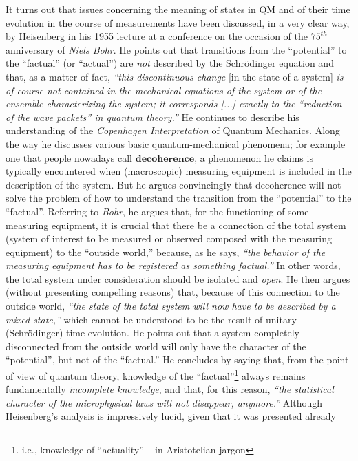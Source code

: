 \documentclass[12pt]{article}
\begin{document}
It turns out that issues concerning the meaning of states in QM and of their time evolution in the course of
measurements have been discussed, in a very clear way, by {Heisenberg} in his 1955 lecture 
\cite{Heisenberg} at a conference on the occasion of the $75^{th}$ anniversary of \textit{Niels Bohr}. He points out 
that transitions from the ``potential'' to the ``factual'' (or ``actual'') are \textit{not} described by the Schr\"odinger equation 
and that, as a matter of fact, \textit{``this discontinuous change} [in the state of a system] \textit{is of course not 
contained in the mechanical equations of the system or of the ensemble characterizing the system; it corresponds [...] 
exactly to the ``reduction of the wave packets'' in quantum theory.''} He continues to describe his 
understanding of the \textit{Copenhagen Interpretation} of Quantum Mechanics. Along the way he discusses various 
basic quantum-mechanical phenomena; for example one that people nowadays call $\mathbf{decoherence}$, a phenomenon 
he claims is typically encountered when (macroscopic) measuring equipment is included in the description of the system. 
But he argues convincingly that decoherence will not solve the problem of how to 
understand the transition from the ``potential'' to the ``factual''. 
Referring to \textit{Bohr}, he argues that, for the functioning 
of some measuring equipment, it is crucial that there be a connection of the total system (system of interest to be 
measured or observed composed with the measuring equipment) to the ``outside world,'' because, as he says, 
\textit{``the behavior of the measuring equipment has to be registered as something factual.''} In other words, the total
system under consideration should be isolated and \textit{open}.
He then argues (without presenting compelling reasons) that, because of this connection to the outside 
world, \textit{``the state of the total system will now have to be  described by a mixed state,''} which 
cannot be understood to be the result of unitary (Schr\"odinger) time evolution.
He points out that a system completely disconnected from the outside world will only 
 have the character of the ``potential'', but not of the ``factual.'' He concludes by saying that, 
from the point of view of quantum theory, knowledge of the ``factual''\footnote{i.e., knowledge of ``actuality'' -- 
in Aristotelian jargon} always remains fundamentally \textit{incomplete knowledge}, and that, for this reason, 
\textit{``the statistical character of the microphysical laws will not disappear, anymore.''}
Although Heisenberg's analysis is impressively lucid, given that it was presented already
\end{document}
